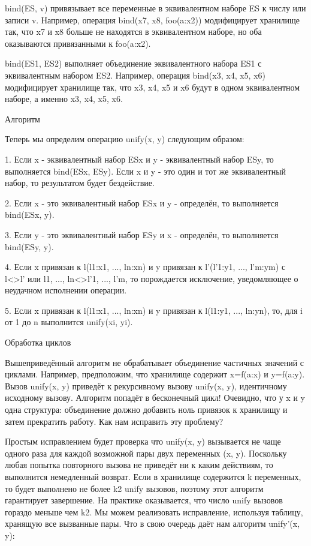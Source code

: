 bind(ES, v) привязывает все переменные в эквивалентном наборе ES к числу или записи v. Например, операция bind({x7, x8}, foo(a:x2)) модифицирует хранилище так, что x7 и x8 больше не находятся в эквивалентном наборе, но оба оказываются привязанными к foo(a:x2).

bind(ES1, ES2) выполняет объединение эквивалентного набора ES1 с эквивалентным набором ES2. Например, операция bind({x3, x4, x5}, {x6}) модифицирует хранилище так, что x3, x4, x5 и x6 будут в одном эквивалентном наборе, а именно {x3, x4, x5, x6}.

Алгоритм

Теперь мы определим операцию unify(x, y) следующим образом:

1. Если x - эквивалентный набор ESx и y - эквивалентный набор ESy, то выполняется bind(ESx, ESy). Если x и y - это один и тот же эквивалентный набор, то результатом будет бездействие.

2. Если x - это эквивалентный набор ESx и y - определён, то выполняется bind(ESx, y).

3. Если y - это эквивалентный набор ESy и x - определён, то выполняется bind(ESy, y).

4. Если x привязан к l(l1:x1, ..., ln:xn) и y привязан к l'(l'1:y1, ..., l'm:ym) с l<>l' или {l1, ..., ln}<>{l'1, ..., l'm}, то порождается исключение, уведомляющее о неудачном исполнении операции.

5. Если x привязан к l(l1:x1, ..., ln:xn) и y привязан к l(l1:y1, ..., ln:yn), то, для i от 1 до n выполнится unify(xi, yi).

Обработка циклов

Вышеприведённый алгоритм не обрабатывает объединение частичных значений с циклами. Например, предположим, что хранилище содержит x=f(a:x) и y=f(a:y). Вызов unify(x, y) приведёт к рекурсивному вызову unify(x, y), идентичному исходному вызову. Алгоритм попадёт в бесконечный цикл! Очевидно, что у x и y одна структура: объединение должно добавить ноль привязок к хранилищу и затем прекратить работу. Как нам исправить эту проблему?

Простым исправлением будет проверка что unify(x, y) вызывается не чаще одного раза для каждой возможной пары двух переменных (x, y). Поскольку любая попытка повторного вызова не приведёт ни к каким действиям, то выполнится немедленный возврат. Если в хранилище содержится k переменных, то будет выполнено не более k2 unify вызовов, поэтому этот алгоритм гарантирует завершение. На практике оказывается, что число unify вызовов гораздо меньше чем k2. Мы можем реализовать исправление, используя таблицу, хранящую все вызванные пары. Что в свою очередь даёт нам алгоритм unify'(x, y):

